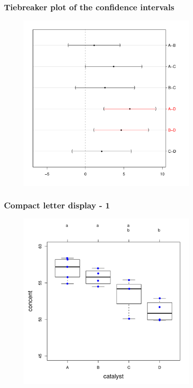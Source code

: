 \documentclass{beamer}
\begin{document}
\begin{frame}
\frametitle{Tiebreaker plot of the confidence intervals}
\begin{figure}
	\centering
		\includegraphics[width=0.80\textwidth]{CI_catalyst.pdf}
	\label{fig:CI_catalyst}
\end{figure}

\end{frame}

\begin{frame}
\frametitle{Compact letter display - 1}
\begin{figure}
	\centering
		\includegraphics[width=0.80\textwidth]{cld_catalyst.pdf}
	\label{fig:cld_catalyst}
\end{figure}
\end{frame}
\end{document}
